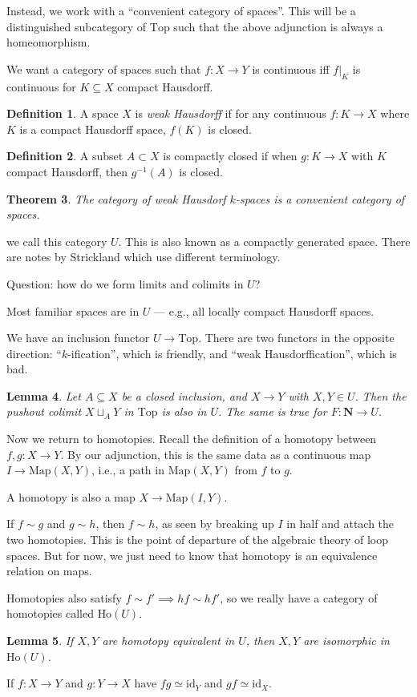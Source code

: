 \documentclass[12pt]{article}
\newtheorem{theorem}{Theorem}[section]
\newtheorem{lemma}[theorem]{Lemma}
\theoremstyle{definition}
\newtheorem{definition}[theorem]{Definition}
\begin{document}
	Instead, we work with a ``convenient category of spaces''. This will be a distinguished subcategory of $\text{Top}$ such that the above adjunction is always a homeomorphism.
	
	We want a category of spaces such that $f:X\to Y$ is continuous iff $f|_{K}$ is continuous for $K\subseteq X$ compact Hausdorff.  
	\begin{definition}
		A space $X$ is \emph{weak Hausdorff} if for any continuous $f:K\to X$ where $K$ is a compact Hausdorff space, $f(K)$ is closed. 
	\end{definition}
	\begin{definition}
		A subset $A\subset X$ is compactly closed if when $g:K\to X$ with $K$ compact Hausdorff, then $g^{-1}(A)$ is closed. 
	\end{definition}
	\begin{theorem}
		The category of weak Hausdorf $k$-spaces is a convenient category of spaces.
	\end{theorem}
	we call this category $U$. This is also known as a compactly generated space. There are notes by Strickland which use different terminology. 
	
	Question: how do we form limits and colimits in $U$? 
	
	Most familiar spaces are in $U$ --- e.g., all locally compact Hausdorff spaces. 
	
	We have an inclusion functor $U\to\text{Top}$. There are two functors in the opposite direction: ``$k$-ification'', which is friendly, and ``weak Hausdorffication'', which is bad. 
	\begin{lemma}
		Let $A\subseteq X$ be a closed inclusion, and $X\to Y$ with $X,Y\in U$. Then the pushout colimit $X\sqcup_{A}Y$ in $\text{Top}$ is also in $U$. The same is true for $F:\mathbf{N}\to U$. 
	\end{lemma} 
	Now we return to homotopies. Recall the definition of a homotopy between $f,g:X\to Y$. By our adjunction, this is the same data as a continuous map $I\to\text{Map}(X,Y) $, i.e., a path in $\text{Map}(X,Y)$ from $f$ to $g$. 
	
	A homotopy is also a map $X\to\text{Map}(I,Y)$. 
	
	If $f\sim g$ and $g\sim h$, then $f\sim h$, as seen by breaking up $I$ in half and attach the two homotopies. This is the point of departure of the algebraic theory of loop spaces. But for now, we just need to know that homotopy is an equivalence relation on maps. 
	
	Homotopies also satisfy $f\sim f'\implies hf\sim hf'$, so we really have a category of homotopies called $\text{Ho}(U)$. 
	\begin{lemma}
		If $X,Y$ are homotopy equivalent in $U$, then $X,Y$ are isomorphic in $\text{Ho}(U)$. 
	\end{lemma}
	If $f:X\to Y$ and $g:Y\to X$ have $fg\simeq\text{id}_{Y}$ and $gf\simeq\text{id}_{X}$. 
	
\end{document}
